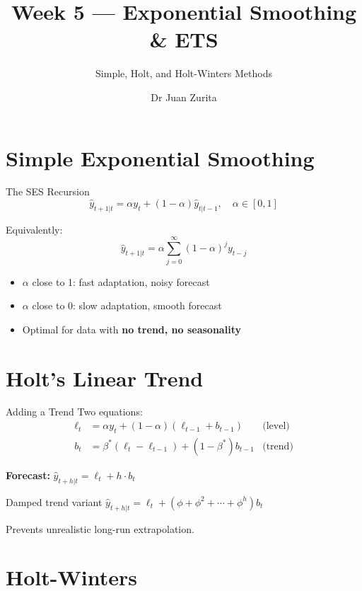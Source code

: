 \documentclass[aspectratio=169, 10pt]{beamer}
\title{Week 5 --- Exponential Smoothing \& ETS}
\subtitle{Simple, Holt, and Holt-Winters Methods}
\author{Dr Juan Zurita}
\institute{Economic \& Business Forecasting\\
The University of Edinburgh~$\cdot$~School of Economics}
\date{}
\begin{document}
\maketitle


\section{Simple Exponential Smoothing}

\begin{frame}{The SES Recursion}
\[
\hat{y}_{t+1|t} = \alpha y_t + (1-\alpha)\hat{y}_{t|t-1}, \quad \alpha \in [0,1]
\]

Equivalently:
\[
\hat{y}_{t+1|t} = \alpha \sum_{j=0}^{\infty} (1-\alpha)^j y_{t-j}
\]

\begin{itemize}
    \item $\alpha$ close to 1: fast adaptation, noisy forecast
    \item $\alpha$ close to 0: slow adaptation, smooth forecast
    \item Optimal for data with \textbf{no trend, no seasonality}
\end{itemize}
\end{frame}

\section{Holt's Linear Trend}

\begin{frame}{Adding a Trend}
Two equations:
\begin{align}
\ell_t &= \alpha y_t + (1-\alpha)(\ell_{t-1} + b_{t-1}) & \text{(level)} \\
b_t &= \beta^*(\ell_t - \ell_{t-1}) + (1-\beta^*)b_{t-1} & \text{(trend)}
\end{align}

\textbf{Forecast:} $\hat{y}_{t+h|t} = \ell_t + h \cdot b_t$

\vspace{0.5em}
\begin{block}{Damped trend variant}
$\hat{y}_{t+h|t} = \ell_t + (\phi + \phi^2 + \cdots + \phi^h) b_t$

Prevents unrealistic long-run extrapolation.
\end{block}
\end{frame}

\section{Holt-Winters}
\end{document}
